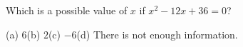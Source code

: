Which is a possible value of $x$ if $x^2-12x+36=0$?

(a) $6$\qquad(b) $2$\qquad(c) $-6$\qquad(d) There is not enough information.
